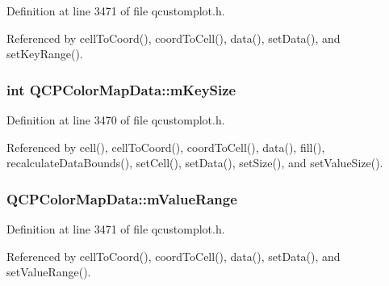 Definition at line 3471 of file qcustomplot.\+h.



Referenced by cell\+To\+Coord(), coord\+To\+Cell(), data(), set\+Data(), and set\+Key\+Range().

\hypertarget{class_q_c_p_color_map_data_a354e06462023340fbc03894b22499f6d}{}
\subsubsection[{m\+Key\+Size}]{\setlength{\rightskip}{0pt plus 5cm}int Q\+C\+P\+Color\+Map\+Data\+::m\+Key\+Size\hspace{0.3cm}{\ttfamily [protected]}}\label{class_q_c_p_color_map_data_a354e06462023340fbc03894b22499f6d}


Definition at line 3470 of file qcustomplot.\+h.



Referenced by cell(), cell\+To\+Coord(), coord\+To\+Cell(), data(), fill(), recalculate\+Data\+Bounds(), set\+Cell(), set\+Data(), set\+Size(), and set\+Value\+Size().

\hypertarget{class_q_c_p_color_map_data_a225bb96f10c1a27b51ae59249477dbef}{}
\subsubsection[{m\+Value\+Range}]{ Q\+C\+P\+Color\+Map\+Data\+::m\+Value\+Range\hspace{0.3cm}{\ttfamily [protected]}}\label{class_q_c_p_color_map_data_a225bb96f10c1a27b51ae59249477dbef}


Definition at line 3471 of file qcustomplot.\+h.



Referenced by cell\+To\+Coord(), coord\+To\+Cell(), data(), set\+Data(), and set\+Value\+Range().

\hypertarget{class_q_c_p_color_map_data_ae8ee9093632a59f55eb4fc06579ed256}{}
